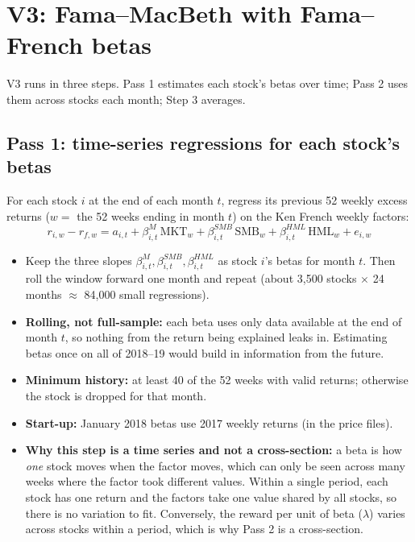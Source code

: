 \documentclass[11pt]{article}
\begin{document}
\section{V3: Fama--MacBeth with Fama--French betas}\label{sec:v3}

V3 runs in three steps. Pass 1 estimates each stock's betas over time; Pass 2 uses them across stocks each month; Step 3 averages.

\subsection*{Pass 1: time-series regressions for each stock's betas}
For each stock $i$ at the end of each month $t$, regress its previous 52 weekly excess returns ($w = $ the 52 weeks ending in month $t$) on the Ken French weekly factors:
\[
r_{i,w} - r_{f,w} = a_{i,t} + \beta^{M}_{i,t}\,\text{MKT}_w + \beta^{SMB}_{i,t}\,\text{SMB}_w + \beta^{HML}_{i,t}\,\text{HML}_w + e_{i,w}
\]
\begin{itemize}
  \item Keep the three slopes $\beta^{M}_{i,t},\beta^{SMB}_{i,t},\beta^{HML}_{i,t}$ as stock $i$'s betas for month $t$. Then roll the window forward one month and repeat (about 3{,}500 stocks $\times$ 24 months $\approx$ 84{,}000 small regressions).
  \item \textbf{Rolling, not full-sample:} each beta uses only data available at the end of month $t$, so nothing from the return being explained leaks in. Estimating betas once on all of 2018--19 would build in information from the future.
  \item \textbf{Minimum history:} at least 40 of the 52 weeks with valid returns; otherwise the stock is dropped for that month.
  \item \textbf{Start-up:} January 2018 betas use 2017 weekly returns (in the price files).
  \item \textbf{Why this step is a time series and not a cross-section:} a beta is how \emph{one} stock moves when the factor moves, which can only be seen across many weeks where the factor took different values. Within a single period, each stock has one return and the factors take one value shared by all stocks, so there is no variation to fit. Conversely, the reward per unit of beta ($\lambda$) varies across stocks within a period, which is why Pass 2 is a cross-section.
\end{itemize}
\end{document}

